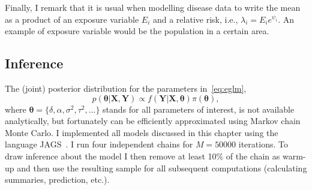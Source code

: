 Finally, I remark that it is usual when modelling disease data to write the mean as a product of an exposure variable $E_i$ and a relative risk, i.e., $\lambda_i = E_i e^{\psi_i}$.
An example of exposure variable would be the population in a certain area.

\subsection{Inference}
\label{sec:mcmc_ch4}

The (joint) posterior distribution for the parameters in~\ref{eq:eglm},
\[ p(\boldsymbol\theta| \boldsymbol X, \boldsymbol Y ) \propto f(\boldsymbol Y | \boldsymbol X, \boldsymbol\theta)\pi(\boldsymbol\theta), \]
where $\boldsymbol\theta = \{ \delta, \alpha, \sigma^2, \tau^2, ...\}$ stands for all parameters of interest, is not available analytically, but fortunately can be efficiently approximated using Markov chain Monte Carlo.
I implemented all models discussed in this chapter using the language JAGS~\citep{Plummer2003}.
I run  four independent chains for $M=50000$ iterations.
To draw inference about the model I then remove at least 10\% of the chain as warm-up and then use the resulting sample for all subsequent computations (calculating summaries, prediction, etc.).


